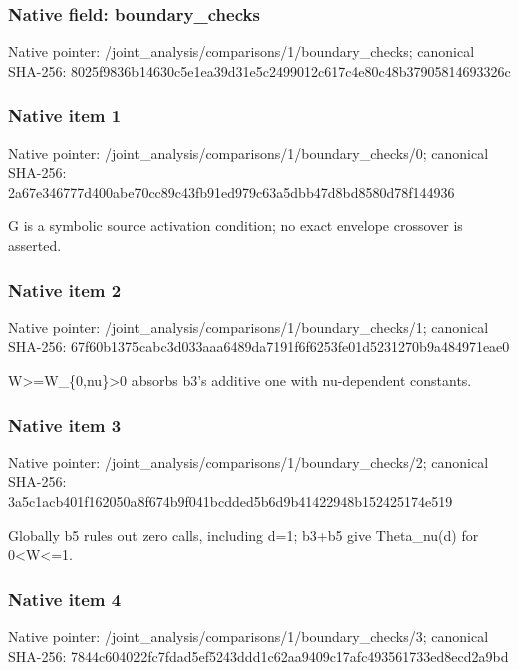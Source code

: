 \documentclass[10pt,a4paper]{article}
\begin{document}
\subsubsection{Native field: boundary\_\allowbreak{}checks}
Native pointer: /joint\_\allowbreak{}analysis/comparisons/1/boundary\_\allowbreak{}checks; canonical SHA-256: 8025f9836b14630c5e1ea39d31e5c2499012c617c4e80c48b37905814693326c

\subsubsection{Native item 1}
Native pointer: /joint\_\allowbreak{}analysis/comparisons/1/boundary\_\allowbreak{}checks/0; canonical SHA-256: 2a67e346777d400abe70cc89c43fb91ed979c63a5dbb47d8bd8580d78f144936

\begingroup\raggedright\sloppy G is a symbolic source activation condition;\allowbreak{} no exact envelope crossover is asserted.\par\endgroup

\subsubsection{Native item 2}
Native pointer: /joint\_\allowbreak{}analysis/comparisons/1/boundary\_\allowbreak{}checks/1; canonical SHA-256: 67f60b1375cabc3d033aaa6489da7191f6f6253fe01d5231270b9a484971eae0

\begingroup\raggedright\sloppy W>=\allowbreak{}W\_\allowbreak{}\{0,\allowbreak{}nu\}>0 absorbs b3's additive one with nu-dependent constants.\par\endgroup

\subsubsection{Native item 3}
Native pointer: /joint\_\allowbreak{}analysis/comparisons/1/boundary\_\allowbreak{}checks/2; canonical SHA-256: 3a5c1acb401f162050a8f674b9f041bcdded5b6d9b41422948b152425174e519

\begingroup\raggedright\sloppy Globally b5 rules out zero calls,\allowbreak{} including d=\allowbreak{}1;\allowbreak{} b3+b5 give Theta\_\allowbreak{}nu(d) for 0<W<=\allowbreak{}1.\par\endgroup

\subsubsection{Native item 4}
Native pointer: /joint\_\allowbreak{}analysis/comparisons/1/boundary\_\allowbreak{}checks/3; canonical SHA-256: 7844c604022fc7fdad5ef5243ddd1c62aa9409c17afc493561733ed8ecd2a9bd
\end{document}
